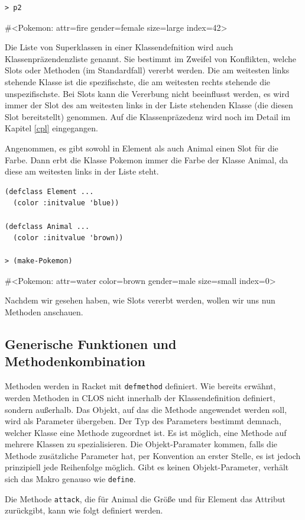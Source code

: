 \begin{lstlisting}
> p2
\end{lstlisting}
{\routput \#<Pokemon: attr=fire gender=female size=large index=42>}

Die Liste von Superklassen in einer Klassendefnition wird auch Klassenpräzendenzliste genannt. Sie bestimmt im Zweifel von Konflikten, welche Slots oder Methoden (im Standardfall) vererbt werden. Die am weitesten links stehende Klasse ist die spezifischste, die am weitesten rechts stehende die unspezifischste. Bei Slots kann die Vererbung nicht beeinflusst werden, es wird immer der Slot des am weitesten links in der Liste stehenden Klasse (die diesen Slot bereitstellt) genommen. Auf die Klassenpräzedenz wird noch im Detail im Kapitel \ref{cpl} eingegangen.

Angenommen, es gibt sowohl in Element als auch Animal einen Slot für die Farbe. Dann erbt die Klasse Pokemon immer die Farbe der Klasse Animal, da diese am weitesten links in der Liste steht.

\begin{lstlisting}
(defclass Element ...
  (color :initvalue 'blue))
  
(defclass Animal ...
  (color :initvalue 'brown))

> (make-Pokemon)
\end{lstlisting}
{\routput \#<Pokemon: attr=water color=brown gender=male size=small index=0>}

Nachdem wir gesehen haben, wie Slots vererbt werden, wollen wir uns nun Methoden anschauen.

\subsection{Generische Funktionen und Methodenkombination}
Methoden werden in Racket mit \texttt{defmethod} definiert. Wie bereits erwähnt, werden Methoden in CLOS nicht innerhalb der Klassendefinition definiert, sondern außerhalb. Das Objekt, auf das die Methode angewendet werden soll, wird als Parameter übergeben. Der Typ des Parameters bestimmt demnach, welcher Klasse eine Methode zugeordnet ist. Es ist möglich, eine Methode auf mehrere Klassen zu spezialisieren. Die Objekt-Paramater kommen, falls die Methode zusätzliche Parameter hat, per Konvention an erster Stelle, es ist jedoch prinzipiell jede Reihenfolge möglich. Gibt es keinen Objekt-Parameter, verhält sich das Makro genauso wie \texttt{define}.

Die Methode \texttt{attack}, die für Animal die Größe und für Element das Attribut zurückgibt, kann wie folgt definiert werden.

